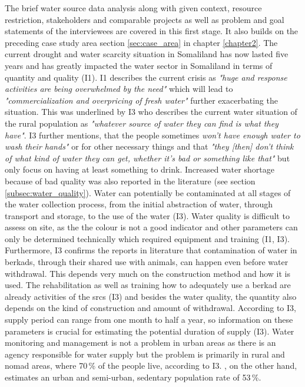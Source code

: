 The brief water source data analysis along with given context, resource restriction, stakeholders and comparable projects as well as problem and goal statements of the interviewees are covered in this first stage. It also builds on the preceding case study area section \ref{sec:case_area} in chapter \ref{chapter2}.\newline
The current drought and water scarcity situation in Somaliland has now lasted five years and has greatly impacted the water sector in Somaliland in terms of quantity and quality (I1). I1 describes the current crisis as \textit{"huge and response activities are being overwhelmed by the need"} which will lead to \textit{"commercialization and overpricing of fresh water"} further exacerbating the situation. This was underlined by I3 who describes the current water situation of the rural population as \textit{"whatever source of water they can find is what they have"}. I3 further mentions, that the people sometimes \textit{won't have enough water to wash their hands"} or for other necessary things and that \textit{"they [then] don't think of what kind of water they can get, whether it's bad or something like that"} but only focus on having at least something to drink. Increased water shortage because of bad quality was also reported in the literature (see section \ref*{subsec:water_quality}). Water can potentially be contaminated at all stages of the water collection process, from the initial abstraction of water, through transport and storage, to the use of the water (I3). Water quality is difficult to assess on site, as the the colour is not a good indicator and other parameters can only be determined technically which required equipment and training (I1, I3). Furthermore, I3 confirms the reports in literature that contamination of water in berkads, through their shared use with animals, can happen even before water withdrawal. This depends very much on the construction method and how it is used. The rehabilitation as well as training how to adequately use a berkad are already activities of the \acrshort*{srcs} (I3) and besides the water quality, the quantity also depends on the kind of construction and amount of withdrawal. According to I3, supply period can range from one month to half a year, so information on these parameters is crucial for estimating the potential duration of supply (I3).\newline
Water monitoring and management is not a problem in urban areas as there is an agency responsible for water supply but the problem is primarily in rural and nomad areas, where 70\,\% of the people live, according to I3. \autocite{republicofsomaliaCountryProfile20212021}, on the other hand, estimates an urban and semi-urban, sedentary population rate of 53\,\%.\newline
